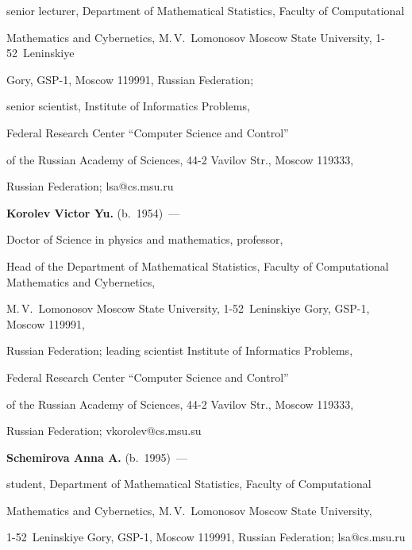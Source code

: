 senior lecturer, Department of Mathematical Statistics, Faculty of Computational 

Mathematics and Cybernetics, M.\,V.~Lomonosov Moscow State University, 1-52~Leninskiye 

Gory, GSP-1, Moscow 119991, Russian Federation; 

senior scientist, Institute of Informatics Problems, 

Federal Research Center ``Computer Science and Control'' 

of the Russian Academy of Sciences, 44-2 Vavilov Str., Moscow 119333, 

Russian Federation; lsa@cs.msu.ru



\vspace*{1pt}



\noindent

\textbf{Korolev Victor Yu.} (b.\ 1954)~---   

Doctor of Science in physics and mathematics, professor, 

Head of the Department of Mathematical Statistics, Faculty of Computational Mathematics and Cybernetics, 

M.\,V.~Lomonosov Moscow State University, 1-52~Leninskiye Gory, GSP-1, Moscow 119991, 

Russian Federation; leading scientist Institute of Informatics Problems, 

Federal Research Center ``Computer Science and Control'' 

of the Russian Academy of Sciences, 44-2 Vavilov Str., Moscow 119333, 

Russian Federation; vkorolev@cs.msu.su





\vspace*{1pt}



\noindent

\textbf{Schemirova Anna A.} (b.\ 1995)~---

student, Department of Mathematical Statistics, Faculty of Computational 

Mathematics and Cybernetics, M.\,V.~Lomonosov Moscow State University, 

1-52~Leninskiye Gory, GSP-1, Moscow 119991, Russian Federation; lsa@cs.msu.ru





 \label{end\stat}





\renewcommand{\bibname}{\protect\rm Литература}


